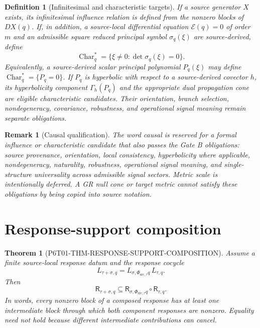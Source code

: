 \documentclass[11pt]{article}
\newtheorem{definition}{Definition}
\newtheorem{theorem}{Theorem}
\newtheorem{remark}{Remark}
\newcommand{\Rel}{\mathsf R}
\newcommand{\Char}{\operatorname{Char}}
\begin{document}
\begin{definition}[Infinitesimal and characteristic targets]
\label{def:characteristic}
If a source generator \(X\) exists, its infinitesimal influence relation is
defined from the nonzero blocks of \(DX(q)\).  If, in addition, a source-local
differential equation \(\mathcal E(q)=0\) of order \(m\) and an admissible
square reduced principal symbol \(\sigma_q(\xi)\) are source-derived, define
\[
 \Char_q^*=
 \{\xi\neq0:\det\sigma_q(\xi)=0\}.
\]
Equivalently, a source-derived scalar principal polynomial
\(P_q(\xi)\) may define \(\Char_q^*=\{P_q=0\}\).  If \(P_q\) is hyperbolic
with respect to a source-derived covector \(h\), its hyperbolicity component
\(\Gamma_h(P_q)\) and the appropriate dual propagation cone are eligible
\emph{characteristic candidates}.  Their orientation, branch selection,
nondegeneracy, covariance, robustness, and operational signal meaning remain
separate obligations.
\end{definition}

\begin{remark}[Causal qualification]
The word \emph{causal} is reserved for a formal influence or characteristic
candidate that also passes the Gate B obligations: source provenance,
orientation, local consistency, hyperbolicity where applicable,
nondegeneracy, naturality, robustness, operational signal meaning, and
single-structure universality across admissible signal sectors.  Metric scale
is intentionally deferred.  A GR null cone or target metric cannot satisfy
these obligations by being copied into source notation.
\end{remark}

\section{Response-support composition}

\begin{theorem}[P6T01-THM-RESPONSE-SUPPORT-COMPOSITION]
\label{thm:composition}
Assume a finite source-local response datum and the response cocycle
\[
 L_{\tau+\sigma,q}
 =L_{\sigma,\Phi_{\mathrm{src},\tau}q}\,L_{\tau,q}.
\]
Then
\[
 \Rel_{\tau+\sigma,q}
 \subseteq
 \Rel_{\sigma,\Phi_{\mathrm{src},\tau}q}\circ\Rel_{\tau,q}.
\]
In words, every nonzero block of a composed response has at least one
intermediate block through which both component responses are nonzero.
Equality need not hold because different intermediate contributions can
cancel.
\end{theorem}
\end{document}
